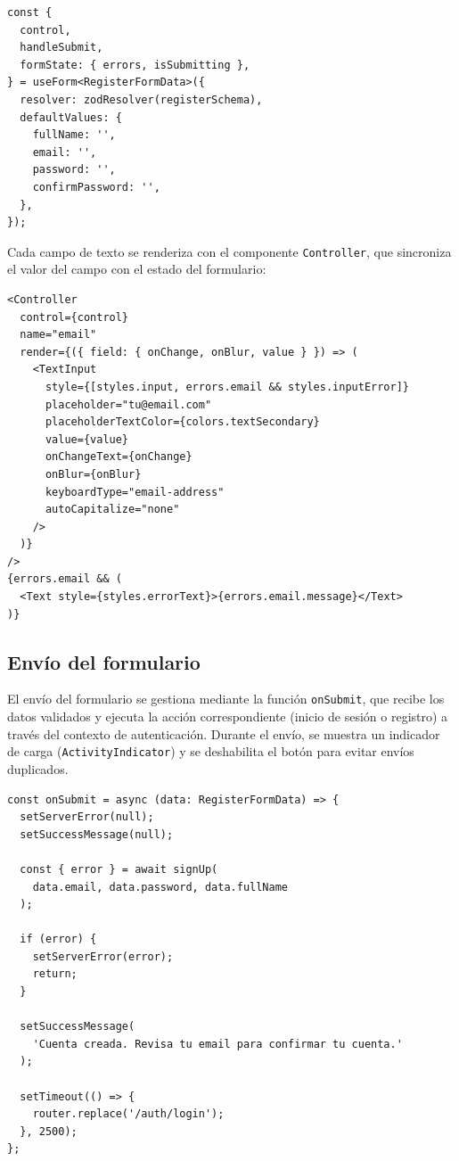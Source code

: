 \begin{lstlisting}
const {
  control,
  handleSubmit,
  formState: { errors, isSubmitting },
} = useForm<RegisterFormData>({
  resolver: zodResolver(registerSchema),
  defaultValues: {
    fullName: '',
    email: '',
    password: '',
    confirmPassword: '',
  },
});
\end{lstlisting}

Cada campo de texto se renderiza con el componente \texttt{Controller}, que
sincroniza el valor del campo con el estado del formulario:

\begin{lstlisting}
<Controller
  control={control}
  name="email"
  render={({ field: { onChange, onBlur, value } }) => (
    <TextInput
      style={[styles.input, errors.email && styles.inputError]}
      placeholder="tu@email.com"
      placeholderTextColor={colors.textSecondary}
      value={value}
      onChangeText={onChange}
      onBlur={onBlur}
      keyboardType="email-address"
      autoCapitalize="none"
    />
  )}
/>
{errors.email && (
  <Text style={styles.errorText}>{errors.email.message}</Text>
)}
\end{lstlisting}

\subsection{Env\'io del formulario}

El env\'io del formulario se gestiona mediante la funci\'on \texttt{onSubmit},
que recibe los datos validados y ejecuta la acci\'on correspondiente (inicio de
sesi\'on o registro) a trav\'es del contexto de autenticaci\'on. Durante el
env\'io, se muestra un indicador de carga (\texttt{ActivityIndicator}) y se
deshabilita el bot\'on para evitar env\'ios duplicados.

\begin{lstlisting}
const onSubmit = async (data: RegisterFormData) => {
  setServerError(null);
  setSuccessMessage(null);

  const { error } = await signUp(
    data.email, data.password, data.fullName
  );

  if (error) {
    setServerError(error);
    return;
  }

  setSuccessMessage(
    'Cuenta creada. Revisa tu email para confirmar tu cuenta.'
  );

  setTimeout(() => {
    router.replace('/auth/login');
  }, 2500);
};
\end{lstlisting}

